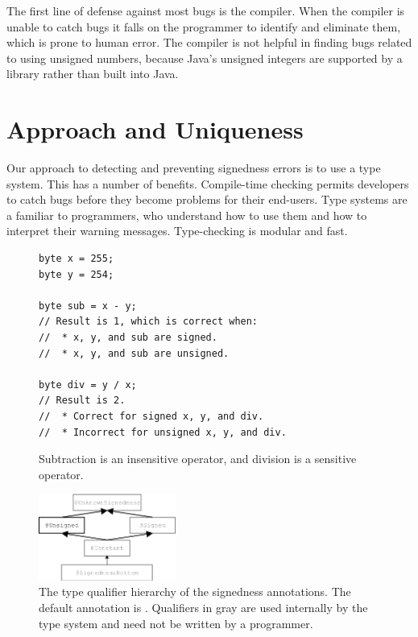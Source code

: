 \documentclass{sig-alternate-05-2015}
\def\<#1>{\codeid{#1}}
\begin{document}
The first line of defense against most bugs is the compiler. When the
compiler is unable to catch bugs it falls on the programmer to identify and
eliminate them, which is prone to human error. The compiler 
is not helpful in finding bugs related to using unsigned
numbers, because Java's unsigned
integers are supported by a library rather than built into Java.


\section{Approach and Uniqueness}

Our approach to detecting and preventing signedness errors is to use a type
system. This has a number of benefits.
%
Compile-time checking permits developers
to catch bugs before they become problems for their end-users.
%
Type systems are a familiar to programmers, who understand how to use them
and how to interpret their warning messages.
%
Type-checking is modular and fast.

\begin{figure}
\begin{lstlisting}
byte x = 255;
byte y = 254;

byte sub = x - y;
// Result is 1, which is correct when:
//  * x, y, and sub are signed.
//  * x, y, and sub are unsigned.

byte div = y / x;
// Result is 2.
//  * Correct for signed x, y, and div.
//  * Incorrect for unsigned x, y, and div.
\end{lstlisting}
\vspace{-10pt}
\caption{Subtraction is an insensitive operator, and
  division is a sensitive operator.}
\label{fig:operators}
\end{figure}


\begin{figure}
    \centering
    \includegraphics[width=0.4\textwidth]{signedness}
    \caption{The type qualifier hierarchy of the signedness annotations.
The default annotation is \<@Signed>.
Qualifiers in gray are used internally by the type system and need not be
written by a programmer.}
    \label{fig:my_label}
\end{figure}
\end{document}
